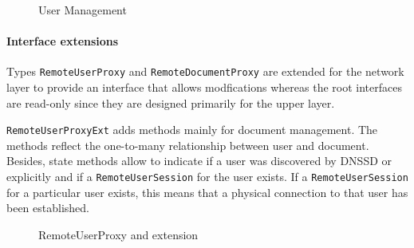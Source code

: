 \begin{figure}[H]
 \centering
 \caption{User Management}
 \label{fig:network.discovery.usermanagement}
\end{figure}

\paragraph{Interface extensions}
Types  \texttt{RemoteUserProxy}  and  \texttt{RemoteDocumentProxy} are extended for the network layer to provide an interface that allows modfications whereas the root interfaces are read-only since they are designed primarily for the upper layer.

 \texttt{RemoteUserProxyExt} adds methods mainly for document management. The methods reflect the one-to-many relationship between user and document. Besides, state methods allow to indicate if a user was discovered by DNSSD or explicitly and if a \texttt{RemoteUserSession} for the user exists. If a \texttt{RemoteUserSession} for a particular user exists, this means that a physical connection to that user has been established.

\begin{figure}[H]
 \centering
 \caption{RemoteUserProxy and extension}
 \label{fig:network.discovery.remoteuserproxy.uml}
\end{figure}


